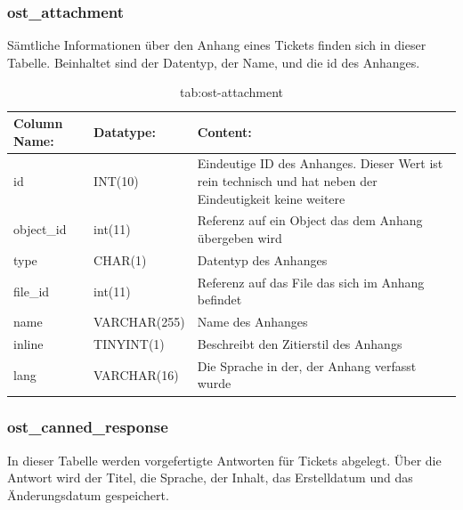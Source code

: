 \subsubsection{ost\_attachment}

Sämtliche Informationen über den Anhang eines Tickets finden sich in dieser Tabelle. Beinhaltet sind der Datentyp, der Name, und die id des Anhanges. 

\begin{table}[h]
	\begin{tabular}{|p{3.5cm}|p{4cm}|p{6.2cm}|}
		\hline
		\textbf{Column Name:} & \textbf{Datatype:} & \textbf{Content:} \\
		\hline
		id & INT(10) & Eindeutige ID des Anhanges. Dieser Wert ist rein technisch und hat neben der Eindeutigkeit keine weitere  \\
		\hline
		object\_id & int(11) & Referenz auf ein Object das dem Anhang übergeben wird \\
		\hline
		type & CHAR(1) & Datentyp des Anhanges \\
		\hline
		file\_id & int(11) & Referenz auf das File das sich im Anhang befindet\\
		\hline
		name & VARCHAR(255) & Name des Anhanges \\
		\hline
		inline & TINYINT(1) & Beschreibt den Zitierstil des Anhangs \\
		\hline
		lang & VARCHAR(16) & Die Sprache in der, der Anhang verfasst wurde \\
		\hline
	\end{tabular}
	\caption{tab:ost-attachment}
\end{table}
\label{tab:ost_attachment}

\newpage

\subsubsection{ost\_canned\_response}

In dieser Tabelle werden vorgefertigte Antworten für Tickets abgelegt. Über die Antwort wird der Titel, die Sprache, der Inhalt, das Erstelldatum und das Änderungsdatum gespeichert.

